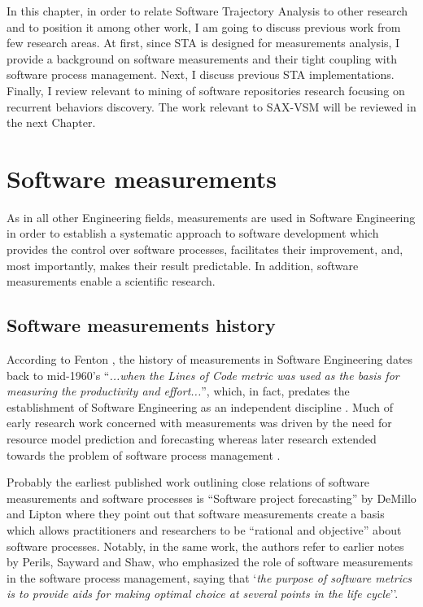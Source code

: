 In this chapter, in order to relate Software Trajectory Analysis to other research and to position it 
among other work, I am going to discuss previous work from few research areas. 
At first, since STA is designed for measurements analysis, I provide a background on software measurements 
and their tight coupling with software process management. 
Next, I discuss previous STA implementations. 
Finally, I review relevant to mining of software repositories research focusing on recurrent behaviors discovery.
The work relevant to SAX-VSM will be reviewed in the next Chapter.

\section{Software measurements}
As in all other Engineering fields, measurements are used in Software Engineering in order to establish a 
systematic approach to software development which provides the control over software processes, facilitates
their improvement, and, most importantly, makes their result predictable. 
In addition, software measurements enable a scientific research.

\subsection{Software measurements history}
According to Fenton \cite{citeulike:1525462}, the history of measurements in Software Engineering dates 
back to mid-1960's  ``\textit{...when the Lines of Code metric was used as the basis for measuring the 
productivity and effort...}'', which, in fact, predates the establishment of Software Engineering as an 
independent discipline \cite{naur_crisis_68}. 
Much of early research work concerned with measurements was driven by the need for resource model prediction 
and forecasting \cite{citeulike:1525462} whereas later research extended towards the problem of software 
process management \cite{citeulike:13158802}.

Probably the earliest published work outlining close relations of software measurements and software 
processes is ``Software project forecasting'' by DeMillo and Lipton \cite{demillo1980software} where they 
point out that software measurements create a basis which allows practitioners and researchers to be 
``rational and objective'' about software processes. 
Notably, in the same work, the authors refer to earlier notes by Perils, Sayward and Shaw, who emphasized 
the role of software measurements in the software process management, saying that `\textit{the purpose of 
software metrics is to provide aids for making optimal choice at several points in the life cycle}''.

